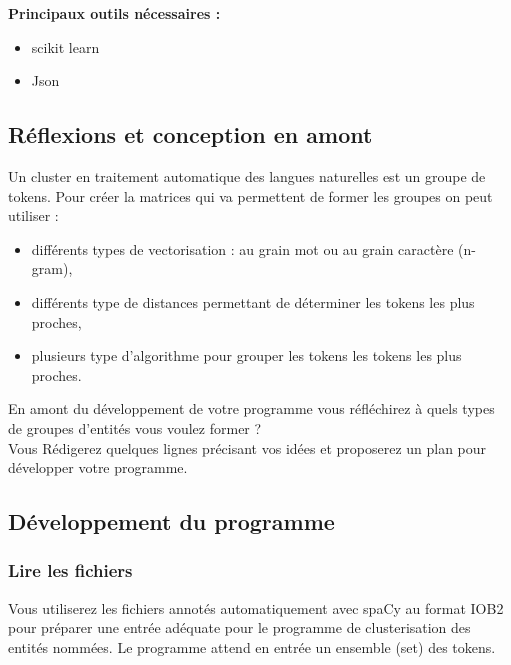 \textbf{Principaux outils nécessaires :}
\begin{itemize}
  \item scikit learn
  \item Json
  
\end{itemize}

\vspace{0.5cm}
\subsection{Réflexions et conception en amont}
\vspace{0.5cm}
\label{sec:amont}

Un cluster en traitement automatique des langues naturelles est un groupe de tokens. Pour créer la matrices qui va permettent de former les groupes on peut utiliser :
\begin{itemize}
\item différents types de vectorisation : au grain mot ou au grain caractère (n-gram),
\item différents type de distances permettant de déterminer les tokens les plus proches,
\item plusieurs type d'algorithme pour grouper les tokens les tokens les plus proches.
\end{itemize}

En amont du développement de votre programme vous réfléchirez à quels types de groupes d'entités vous voulez former ?\\
Vous Rédigerez quelques lignes précisant vos idées et proposerez un plan pour développer votre programme.

\subsection{Développement du programme}


\vspace{0.5cm}
\subsubsection*{Lire les fichiers}
\vspace{0.5cm}
Vous utiliserez les fichiers annotés automatiquement avec spaCy au format IOB2 pour préparer une entrée adéquate pour le programme de clusterisation des entités nommées. Le programme attend en entrée un ensemble (set) des tokens.


